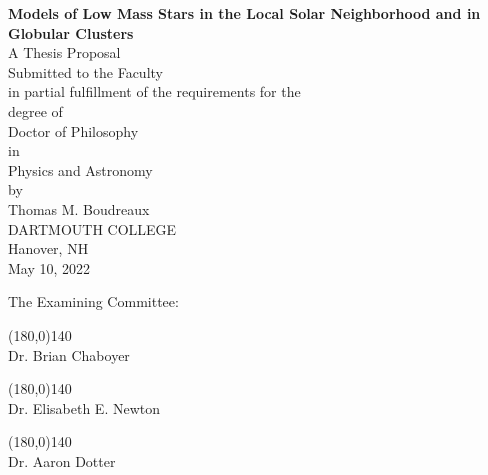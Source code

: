 \documentclass[11pt, manuscript]{aastex62}
\begin{document}
\nopagecolor

\begin{titlepage}
    \begin{center}
        \Large
        \vspace*{1cm}
		\textbf{Models of Low Mass Stars in the Local Solar Neighborhood and in Globular Clusters} \\
        \vspace{0.75cm}
        \large
        A Thesis Proposal \\
        \vspace{0.25cm}
        Submitted to the Faculty \\
        in partial fulfillment of the requirements for the \\
        degree of \\
        \vspace{0.25cm}
        Doctor of Philosophy \\
        \vspace{0.25cm}
        in \\
        \vspace{0.25cm}
        Physics and Astronomy \\
        \vspace{0.5cm}
        by \\
        \vspace{0.25cm}
        Thomas M. Boudreaux \\
        \vspace{0.3cm}
        DARTMOUTH COLLEGE \\
        Hanover, NH \\
        May 10, 2022
     \end{center}
\vspace{1cm}
\begin{flushright}
The Examining Committee: \hspace{\parindent}
\vspace{0.4cm}
\end{flushright}
\begin{flushright}
\line(180,0){140}\\
        Dr. Brian Chaboyer
        \end{flushright}
        
        \begin{flushright}
        \line(180,0){140}\\
        Dr. Elisabeth E. Newton
        \end{flushright}
        
        \begin{flushright}
        \line(180,0){140}\\
        Dr. Aaron Dotter
        \end{flushright}

\end{titlepage}
\end{document}
